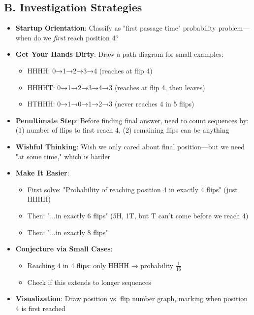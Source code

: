 \documentclass[]{article}
\begin{document}
\begin{strategicbox}
\subsection*{B. Investigation Strategies}
\begin{itemize}[leftmargin=*]
    \item \textbf{Startup Orientation}: Classify as "first passage time" probability problem—when do we \textit{first} reach position 4?
    \item \textbf{Get Your Hands Dirty}: Draw a path diagram for small examples:
    \begin{itemize}
        \item HHHH: 0→1→2→3→4 (reaches at flip 4)
        \item HHHHT: 0→1→2→3→4→3 (reaches at flip 4, then leaves)
        \item HTHHH: 0→1→0→1→2→3 (never reaches 4 in 5 flips)
    \end{itemize}
    \item \textbf{Penultimate Step}: Before finding final answer, need to count sequences by: (1) number of flips to first reach 4, (2) remaining flips can be anything
    \item \textbf{Wishful Thinking}: Wish we only cared about final position—but we need "at some time," which is harder
    \item \textbf{Make It Easier}: 
    \begin{itemize}
        \item First solve: "Probability of reaching position 4 in exactly 4 flips" (just HHHH)
        \item Then: "...in exactly 6 flips" (5H, 1T, but T can't come before we reach 4)
        \item Then: "...in exactly 8 flips"
    \end{itemize}
    \item \textbf{Conjecture via Small Cases}: 
    \begin{itemize}
        \item Reaching 4 in 4 flips: only HHHH → probability $\frac{1}{16}$
        \item Check if this extends to longer sequences
    \end{itemize}
    \item \textbf{Visualization}: Draw position vs. flip number graph, marking when position 4 is first reached
\end{itemize}


\end{strategicbox}
\end{document}

